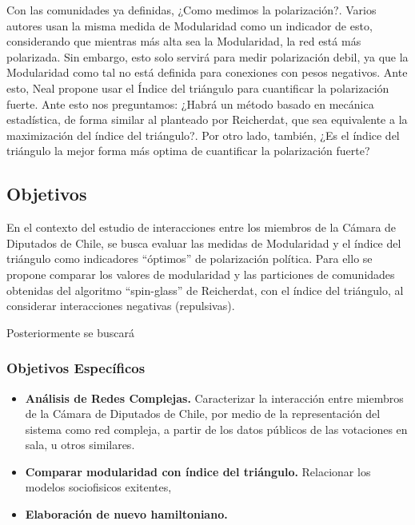 \documentclass{proyectotesis}
\begin{document}
Con las comunidades ya definidas, ¿Como medimos la polarización?. Varios autores usan la misma medida de Modularidad como un indicador de esto, considerando que mientras más alta sea la Modularidad, la red está más polarizada. Sin embargo, esto solo servirá para medir polarización debil, ya que la Modularidad como tal no está definida para conexiones con pesos negativos. Ante esto, Neal propone usar el Índice del triángulo para cuantificar la polarización fuerte. Ante esto nos preguntamos: ¿Habrá un método basado en mecánica estadística, de forma similar al planteado por Reicherdat, que sea equivalente a la maximización del índice del triángulo?. Por otro lado, también, ¿Es el índice del triángulo la mejor forma más optima de cuantificar la polarización fuerte?

\subsection{Objetivos}

En el contexto del estudio de interacciones entre los miembros de la Cámara de Diputados de Chile, se busca evaluar las medidas de Modularidad y el índice del triángulo como indicadores ``óptimos'' de polarización política. Para ello se propone comparar los valores de modularidad y las particiones de comunidades obtenidas del algoritmo ``spin-glass'' de Reicherdat, con el índice del triángulo, al considerar interacciones negativas (repulsivas). 

Posteriormente se buscará 

\subsubsection*{Objetivos Específicos}
\begin{itemize}
\item    {\bf Análisis de Redes Complejas.} Caracterizar la interacción entre miembros de la Cámara de Diputados de Chile, por medio de la representación del sistema como red compleja, a partir de los datos públicos de las votaciones en sala, u otros similares.

\item{\bf Comparar modularidad con índice del triángulo.} Relacionar los modelos sociofisicos exitentes, 

\item {\bf Elaboración de nuevo hamiltoniano.} 

\end{itemize}
\end{document}
